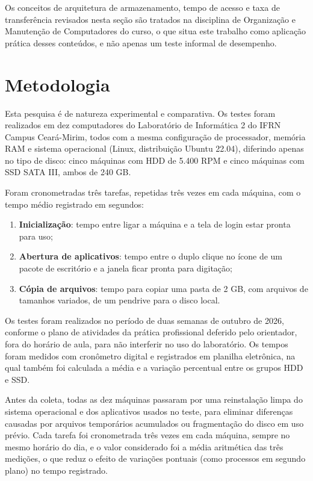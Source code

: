 \documentclass[article,12pt,a4paper]{abntex2}
\begin{document}
Os conceitos de arquitetura de armazenamento, tempo de acesso e taxa de
transferência revisados nesta seção são tratados na disciplina de
Organização e Manutenção de Computadores do curso, o que situa este trabalho
como aplicação prática desses conteúdos, e não apenas um teste informal de
desempenho.

\section{Metodologia}

Esta pesquisa é de natureza experimental e comparativa. Os testes foram
realizados em dez computadores do Laboratório de Informática 2 do IFRN
Campus Ceará-Mirim, todos com a mesma configuração de processador, memória
RAM e sistema operacional (Linux, distribuição Ubuntu 22.04), diferindo
apenas no tipo de disco: cinco máquinas com HDD de 5.400 RPM e cinco
máquinas com SSD SATA III, ambos de 240 GB.

Foram cronometradas três tarefas, repetidas três vezes em cada máquina, com
o tempo médio registrado em segundos:

\begin{enumerate}
  \item \textbf{Inicialização}: tempo entre ligar a máquina e a tela de
        login estar pronta para uso;
  \item \textbf{Abertura de aplicativos}: tempo entre o duplo clique no
        ícone de um pacote de escritório e a janela ficar pronta para
        digitação;
  \item \textbf{Cópia de arquivos}: tempo para copiar uma pasta de 2 GB,
        com arquivos de tamanhos variados, de um pendrive para o disco
        local.
\end{enumerate}

Os testes foram realizados no período de duas semanas de outubro de 2026,
conforme o plano de atividades da prática profissional deferido pelo
orientador, fora do horário de aula, para não interferir no uso do
laboratório. Os tempos foram medidos com cronômetro digital e registrados em
planilha eletrônica, na qual também foi calculada a média e a variação
percentual entre os grupos HDD e SSD.

Antes da coleta, todas as dez máquinas passaram por uma reinstalação limpa
do sistema operacional e dos aplicativos usados no teste, para eliminar
diferenças causadas por arquivos temporários acumulados ou fragmentação do
disco em uso prévio. Cada tarefa foi cronometrada três vezes em cada
máquina, sempre no mesmo horário do dia, e o valor considerado foi a média
aritmética das três medições, o que reduz o efeito de variações pontuais
(como processos em segundo plano) no tempo registrado.
\end{document}
